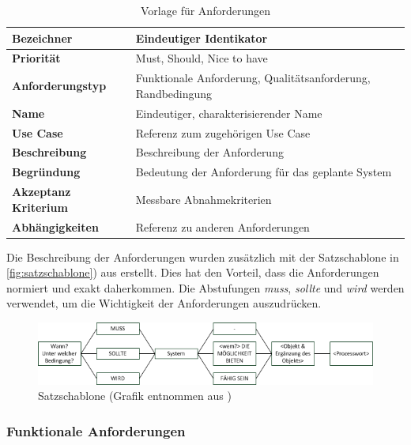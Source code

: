 \begin{table}[ht]
\centering
  \begin{tabular}{ l | p{8cm} }
	\hline
	\rowcolor{gray}
	\textbf{Bezeichner}&	\textbf{Eindeutiger Identikato}r\\ \hline
	\textbf{Priorität} 		&	Must, Should, Nice to have\\ \hline
	\textbf{Anforderungstyp}	&	Funktionale Anforderung, Qualitätsanforderung, Randbedingung\\ \hline
	\textbf{Name} 			&	Eindeutiger, charakterisierender Name\\ \hline
	\textbf{Use Case} 		&	Referenz zum zugehörigen Use Case\\ \hline
	\textbf{Beschreibung} 	&	Beschreibung der Anforderung\\ \hline
	\textbf{Begründung} 		&	Bedeutung der Anforderung für das geplante System\\ \hline
	\textbf{Akzeptanz Kriterium}	&	Messbare Abnahmekriterien\\ \hline
	\textbf{Abhängigkeiten} 	&	Referenz zu anderen Anforderungen\\ \hline
  \end{tabular}
   \caption{Vorlage für Anforderungen}\label{table:req_template}
\end{table}


Die Beschreibung der Anforderungen wurden zusätzlich mit der Satzschablone in \autoref{fig:satzschablone}) aus \cite{req_eng_book} erstellt. Dies hat den Vorteil, dass die 
Anforderungen normiert und exakt daherkommen. Die Abstufungen \textit{muss}, \textit{sollte} und \textit{wird} werden verwendet, um die Wichtigkeit der Anforderungen auszudrücken.
\begin{figure}[h]
\includegraphics[scale=0.95]{images/anforderungen/satzschablone.png}
\caption[Satzschablone]{Satzschablone (Grafik entnommen aus \cite{req_eng_book})}
\label{fig:satzschablone}
\end{figure}


\newpage
\FloatBarrier
\subsubsection{Funktionale Anforderungen}\label{func_anforderungen}

